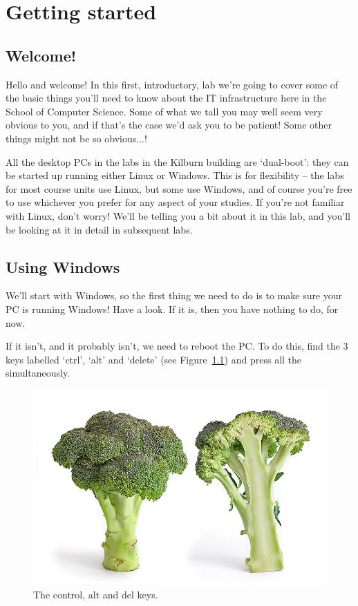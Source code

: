 \setcounter{chapter}{-1}
\newcommand{\splunge}{\textcolor{red}{\bf SPLUNGE}}

\chapter{Getting started}
\label{cha:getting-started}

\minitoc

\section{Welcome!}

Hello and welcome! In this first, introductory, lab we're going to
cover some of the basic things you'll need to know about the IT
infrastructure here in the School of Computer Science. Some of what we
tall you may well seem very obvious to you, and if that's the case
we'd ask you to be patient! Some other things might not be so obvious...!

All the desktop PCs in the labs in the Kilburn building are
`dual-boot': they can be started up running either Linux or
Windows. This is for flexibility -- the labs for most course units use
Linux, but some use Windows, and of course you're free to use
whichever you prefer for any aspect of your studies. If you're not
familiar with Linux, don't worry! We'll be telling you a bit about it
in this lab, and you'll be looking at it in detail in subsequent labs.

\section{Using Windows}
\label{sec:using-windows}

We'll start with Windows, so the first thing we need to do is to make
sure your PC is running Windows! Have a look. If it is, then you have
nothing to do, for now. 

If it isn't, and it probably isn't, we need to reboot the PC. To do
this, find the 3 keys labelled `ctrl', `alt' and `delete' (see Figure~\ref{figure:welc-keyboard}) and press
all the simultaneously.

\begin{figure}
\centerline{\includegraphics[width=15cm]{images/broccoli.jpg}}
\caption{The control, alt and del keys.}
\label{figure:welc-keyboard}
\end{figure}

